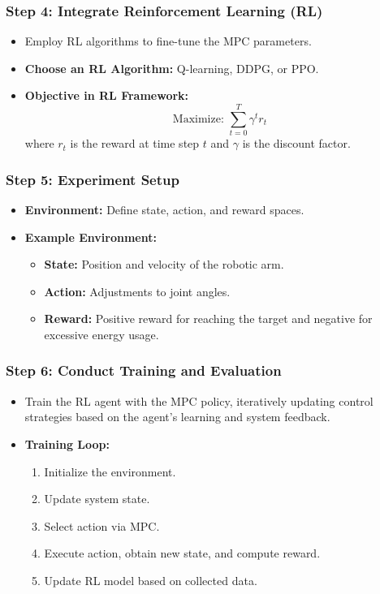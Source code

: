 \documentclass[aspectratio=169]{beamer}
\begin{document}
\begin{frame}[fragile]
    \frametitle{Step 4: Integrate Reinforcement Learning (RL)}
    \begin{itemize}
        \item Employ RL algorithms to fine-tune the MPC parameters.
        \item \textbf{Choose an RL Algorithm:} Q-learning, DDPG, or PPO.
        \item \textbf{Objective in RL Framework:}
        \begin{equation}
            \text{Maximize: } \sum_{t=0}^{T} \gamma^t r_t
        \end{equation}
        where \( r_t \) is the reward at time step \( t \) and \( \gamma \) is the discount factor.
    \end{itemize}
\end{frame}

\begin{frame}[fragile]
    \frametitle{Step 5: Experiment Setup}
    \begin{itemize}
        \item \textbf{Environment:} Define state, action, and reward spaces.
        \item \textbf{Example Environment:}
        \begin{itemize}
            \item \textbf{State:} Position and velocity of the robotic arm.
            \item \textbf{Action:} Adjustments to joint angles.
            \item \textbf{Reward:} Positive reward for reaching the target and negative for excessive energy usage.
        \end{itemize}
    \end{itemize}
\end{frame}

\begin{frame}[fragile]
    \frametitle{Step 6: Conduct Training and Evaluation}
    \begin{itemize}
        \item Train the RL agent with the MPC policy, iteratively updating control strategies based on the agent's learning and system feedback.
        \item \textbf{Training Loop:}
        \begin{enumerate}
            \item Initialize the environment.
            \item Update system state.
            \item Select action via MPC.
            \item Execute action, obtain new state, and compute reward.
            \item Update RL model based on collected data.
        \end{enumerate}
    \end{itemize}
\end{frame}
\end{document}
